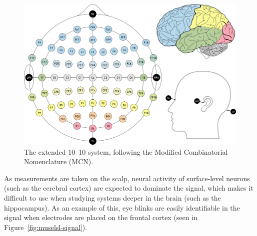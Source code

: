     \begin{landscape}
        \begin{figure}
            \begin{center}
                \includegraphics[width=20cm]{img/1020system-extended-with-extra-info.png}
            \end{center}
            \caption{The extended 10–10 system, following the Modified Combinatorial Nomenclature (MCN).}\label{fig:1010}
        \end{figure}
    \end{landscape}

    As measurements are taken on the scalp, neural activity of surface-level neurons (such as the cerebral cortex) are expected to dominate the signal, which makes it difficult to use when studying systems deeper in the brain (such as the hippocampus). As an example of this, eye blinks are easily identifiable in the signal when electrodes are placed on the frontal cortex (seen in Figure~\ref{fig:muselsl-signal}).

